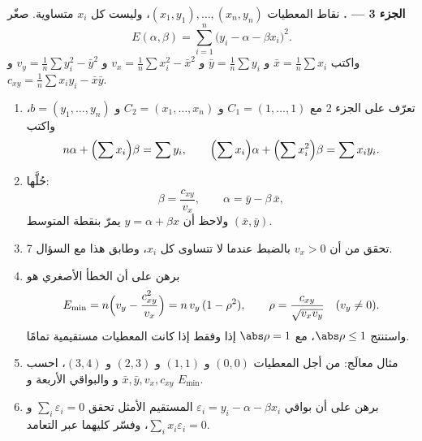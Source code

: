 \begin{problem}
\medskip
\noindent\textbf{الجزء 3 --- .} نقاط المعطيات
$(x_1, y_1), \dots, (x_n, y_n)$، وليست كل $x_i$ متساوية. صغّر
\[
E(\alpha, \beta) = \sum_{i=1}^{n}\bigl(y_i - \alpha - \beta
x_i\bigr)^2 .
\]
واكتب $\bar x = \frac1n\sum x_i$ و $\bar y = \frac1n\sum y_i$ و
$v_x = \frac1n\sum x_i^2 - \bar x^2$ و $v_y = \frac1n\sum y_i^2 -
\bar y^2$ و $c_{xy} = \frac1n\sum x_i y_i - \bar x\bar y$.
\begin{enumerate}[resume]
  \item تعرّف على الجزء 2 مع $C_1 = (1, \dots, 1)$ و $C_2 =
        (x_1, \dots, x_n)$ و $b = (y_1, \dots, y_n)$، واكتب
        \[
        n\alpha + \Bigl(\sum x_i\Bigr)\beta = \sum y_i,
        \qquad
        \Bigl(\sum x_i\Bigr)\alpha + \Bigl(\sum
        x_i^2\Bigr)\beta = \sum x_i y_i .
        \]
  \item حُلَّها:
        \[
        \beta = \frac{c_{xy}}{v_x},
        \qquad
        \alpha = \bar y - \beta\,\bar x ,
        \]
        ولاحظ أن \emph{} $y = \alpha
        + \beta x$ يمرّ بنقطة المتوسط $(\bar x, \bar
        y)$.
  \item تحقق من أن $v_x > 0$ بالضبط عندما لا تتساوى كل
        $x_i$، وطابق هذا مع السؤال 7.
  \item برهن على أن الخطأ الأصغري هو
        \[
        E_{\min} = n\Bigl(v_y - \frac{c_{xy}^2}{v_x}\Bigr)
        = n\,v_y\,(1 - \rho^2),
        \qquad
        \rho = \frac{c_{xy}}{\sqrt{v_x v_y}}
        \quad (v_y \neq 0).
        \]
        واستنتج $\abs\rho \leq 1$، مع $\abs\rho = 1$ إذا وفقط
        إذا كانت المعطيات مستقيمية تمامًا.
  \item مثال معالَج: من أجل المعطيات $(0,0)$ و $(1,1)$ و $(2,3)$
        و $(3,4)$، احسب $\bar x, \bar y, v_x, c_{xy}$ و
         والبواقي الأربعة و $E_{\min}$.
  \item برهن على أن بواقي $\varepsilon_i = y_i - \alpha -
        \beta x_i$ المستقيم الأمثل تحقق $\sum_i
        \varepsilon_i = 0$ و $\sum_i x_i\varepsilon_i = 0$،
        وفسّر كليهما عبر التعامد.
\end{enumerate}


\end{problem}
